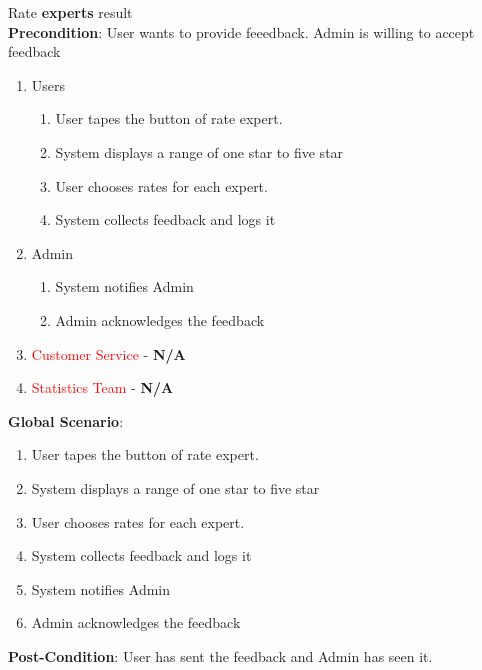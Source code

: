 \item Rate \textbf{experts} result  \\
\textbf{Precondition}: User wants to provide feeedback. Admin is willing to accept feedback
	\begin{enumerate}[{\bf VP1.}]
		\item Users
		\begin{enumerate}[{\bf 1.}]
			\item User tapes the button of rate expert.
			\item System displays a range of one star to five star
			\item User chooses rates for each expert.
			\item System collects feedback and logs it
		\end{enumerate}
		\item Admin
		\begin{enumerate}[{\bf 1.}]
			\item System notifies Admin
			\item Admin acknowledges the feedback
		\end{enumerate}
		\item \textcolor{red}{Customer Service} - \textbf{N/A}
		\item \textcolor{red}{Statistics Team} - \textbf{N/A}
	\end{enumerate}
\textbf{Global Scenario}:
\begin{enumerate}[{\bf 1.}]
	\item User tapes the button of rate expert.
	\item System displays a range of one star to five star
	\item User chooses rates for each expert.
	\item System collects feedback and logs it
	\item System notifies Admin
	\item Admin acknowledges the feedback
\end{enumerate}
\textbf{Post-Condition}: User has sent the feedback and Admin has seen it.